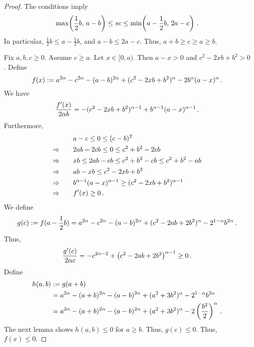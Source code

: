 \begin{proof}
	The conditions imply
	\begin{equation*}
		\max\!\left( \frac 12 b,\, a-b \right) \leq sc \leq \min\!\left( a-\frac12b,\, 2a-c \right)
		\, .
	\end{equation*}
	In particular, $\frac 12 b \leq a-\frac12b$, and $a-b \leq 2a-c$. Thus, $a+b \geq c \geq a \geq b$.
	
	Fix $a,b,c \geq 0$.
	Assume $c \geq a$. Let $x \in[0,a)$. Then $a-x>0$ and $c^2 - 2 x b + b^2 >0$.
	Define 
	\begin{equation*}
		f(x) := a^{2\alpha}-c^{2\alpha}-(a-b)^{2\alpha}+(c^2 - 2 x b + b^2)^\alpha  - 2 b^\alpha (a-x)^{\alpha}
		\, .
	\end{equation*}
	We have
	\begin{equation*}
		\frac{f^\prime(x) }{2 \alpha b} = -(c^2 - 2 x b + b^2)^{\alpha-1}  + b^{\alpha-1} (a-x)^{\alpha-1}
		\, .
	\end{equation*}
	Furthermore,
	\begin{align*}
		&a-c\leq 0 \leq (c-b)^2
		\\\Rightarrow\qquad&
		2ab-2cb \leq 0 \leq c^2+b^2-2cb
		\\\Rightarrow\qquad&
		xb \leq 2ab-cb \leq c^2+b^2-cb \leq c^2+b^2 -ab
		\\\Rightarrow\qquad&
		ab -xb \leq c^2-2xb + b^2
		\\\Rightarrow\qquad&
		b^{\alpha-1} (a-x)^{\alpha-1} \geq (c^2 - 2 x b + b^2)^{\alpha-1}
		\\\Rightarrow\qquad&
		f^\prime(x) \geq 0\, .
	\end{align*}
	We define
	\begin{equation*}
		g(c) := f(a-\frac12b) = a^{2\alpha}-c^{2\alpha}-(a-b)^{2\alpha}+(c^2 - 2 a b + 2 b^2)^\alpha  - 2^{1-\alpha} b^{2\alpha}
		\, .
	\end{equation*}
	Thus,
	\begin{equation*}
		\frac{g^\prime(c)}{2\alpha c} = -c^{2\alpha-2}+\left( c^2 - 2 a b + 2 b^2 \right)^{\alpha-1} \geq 0
		\, .
	\end{equation*}
	Define
	\begin{align*}
		h (a,b) &:= 
		g(a+b) 
		\\&= 
		a^{2\alpha}-(a+b)^{2\alpha}-(a-b)^{2\alpha}+(a^2  + 3 b^2)^\alpha  - 2^{1-\alpha} b^{2\alpha}
		\\&=
		a^{2\alpha}-(a+b)^{2\alpha}-(a-b)^{2\alpha}+(a^2  + 3 b^2)^\alpha  - 2\left( \frac{b^2}{2} \right)^{\alpha}
		\, .
	\end{align*}
	The next lemma shows $h(a,b) \leq 0$ for $a\geq b$. Thus, $g(c) \leq 0$. Thus, $f(x) \leq 0$.
\end{proof}

